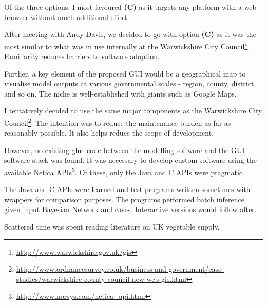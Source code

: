 \documentclass[12pt,notitlepage]{article}
\begin{document}
\begin{multicols}{2}
Of the three options, I most favoured \textbf{(C)} as it targets any platform with a web browser without much additional effort.

After meeting with Andy Davis, we decided to go with option \textbf{(C)} as it was the most similar to what was in use internally at the Warwickshire City Council\footnote{\url{http://www.warwickshire.gov.uk/gis}}. Familiarity reduces barriers to software adoption.

Further, a key element of the proposed GUI would be a geographical map to visualise model outputs at various governmental scales - region, county, district and so on. The niche is well-established with giants such as Google Maps.

I tentatively decided to use the same major components as the Warwickshire City Council\footnote{\url{http://www.ordnancesurvey.co.uk/business-and-government/case-studies/warwickshire-county-council-new-web-gis.html}}. The intention was to reduce the maintenance burden as far as reasonably possible. It also helps reduce the scope of development.

However, no existing glue code between the modelling software and the GUI software stack was found. It was necessary to develop custom software using the available Netica APIs\footnote{\url{http://www.norsys.com/netica_api.html}}. Of these, only the Java and C APIs were pragmatic.

The Java and C APIs were learned and test programs written sometimes with wrappers for comparison purposes. The programs performed batch inference given input Bayesian Network and cases. Interactive versions would follow after.

Scattered time was spent reading literature on UK vegetable supply.
\end{multicols}
\end{document}

